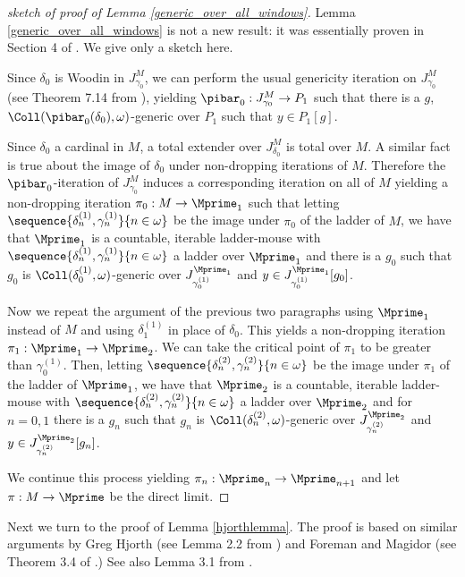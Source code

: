 \documentclass[oneside,12pt]{amsart}
\begin{document}
\begin{proof}[sketch of proof of Lemma \ref{generic_over_all_windows}]
Lemma \ref{generic_over_all_windows} is not a new result: it was essentially
proven in Section 4 of \cite{Mouse_Sets}. We give only a sketch here.

Since $\delta_0$ is Woodin in $J^M_{\gamma_0}$,
we can perform the usual genericity iteration on $J^M_{\gamma_0}$
(see Theorem 7.14 from \cite{OutlineOfInnerModelTheory}), yielding
$\pibar_0:J^M_{\gamma_0}\to P_1$ such that
there is a $g$, $\Coll(\pibar_0(\delta_0),\omega)$-generic over $P_1$ such that $y\in P_1[g]$.

Since $\delta_0$ a cardinal in $M$, a total extender over $J^M_{\delta_0}$ is total
over $M$. A similar fact is true about the image of $\delta_0$ under non-dropping
iterations of $M$.
Therefore the $\pibar_0$-iteration of $J^M_{\gamma_0}$ induces a corresponding iteration on all of $M$
yielding a non-dropping iteration $\pi_0:M\to \Mprime_1$ such that
letting $\sequence{\delta^{(1)}_n,\gamma^{(1)}_n}{n\in\omega}$ be the image under $\pi_0$
of the ladder of $M$, we have that $\Mprime_1$ is a countable, iterable ladder-mouse
with $\sequence{\delta^{(1)}_n,\gamma^{(1)}_n}{n\in\omega}$ a ladder over $\Mprime_1$
and there is a $g_0$ such that $g_0$
is $\Coll(\delta^{(1)}_0,\omega)$-generic over
$J^{\Mprime_1}_{\gamma^{(1)}_0}$ and $y\in J^{\Mprime_1}_{\gamma^{(1)}_0}[g_0]$.

Now we repeat the argument of the previous two paragraphs using $\Mprime_1$ instead of $M$
and using $\delta^{(1)}_1$ in place of $\delta_0$. This yields a non-dropping iteration
$\pi_1:\Mprime_1\to\Mprime_2$. We can take the critical point of $\pi_1$ to be
greater than $\gamma^{(1)}_0$. Then,
letting $\sequence{\delta^{(2)}_n,\gamma^{(2)}_n}{n\in\omega}$ be the image under $\pi_1$
of the ladder of $\Mprime_1$, we have that $\Mprime_2$ is a countable, iterable ladder-mouse
with $\sequence{\delta^{(2)}_n,\gamma^{(2)}_n}{n\in\omega}$ a ladder over $\Mprime_2$
and for $n=0,1$ there is a $g_n$ such that $g_n$
is $\Coll(\delta^{(2)}_n,\omega)$-generic over
$J^{\Mprime_2}_{\gamma^{(2)}_n}$ and $y\in J^{\Mprime_2}_{\gamma^{(2)}_n}[g_n]$.

We continue this process yielding $\pi_n:\Mprime_n\to\Mprime_{n+1}$ and
let $\pi:M\to\Mprime$ be the direct limit.

\end{proof}

Next we turn to the proof of Lemma \ref{hjorthlemma}.
The proof is based on similar arguments by Greg Hjorth (see Lemma 2.2 from \cite{Hjorth_applications_of_course_imt}) and Foreman and Magidor (see Theorem 3.4 of \cite{Foreman_and_Magidor}.)
See also Lemma 3.1 from \cite{Schlict_Thin_Equivalence_Relations}.
\end{document}
